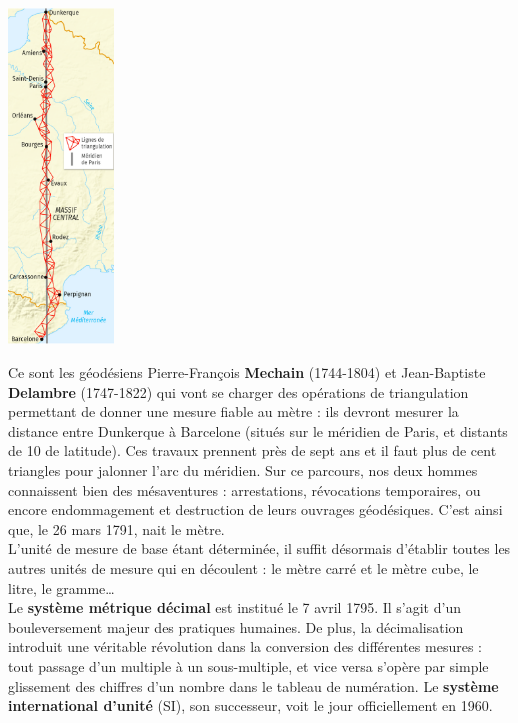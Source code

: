\begin{minipage}{3.25cm}
   \includegraphics[width=2.8cm]{Grandeurs_mesures/Images/M13_cours_meridien}
\end{minipage}
\begin{minipage}{13.45cm}
   Ce sont les géodésiens Pierre-François \textbf{Mechain} (1744-1804) et Jean-Baptiste \textbf{Delambre} (1747-1822) qui vont se charger des opérations de triangulation permettant de donner une mesure fiable au mètre : ils devront mesurer la distance entre Dunkerque à Barcelone (situés sur le méridien de Paris, et distants de 10\degre{} de latitude). Ces travaux prennent près de sept ans et il faut plus de cent triangles pour jalonner l'arc du méridien. Sur ce parcours, nos deux hommes connaissent bien des mésaventures : arrestations, révocations temporaires, ou encore endommagement et destruction de leurs ouvrages géodésiques\footnotemark[2]. C'est ainsi que, le 26 mars 1791, nait le mètre. \\ [2mm] 
   L'unité de mesure de base étant déterminée, il suffit désormais d'établir toutes les autres unités de mesure qui en découlent : le mètre carré et le mètre cube, le litre, le gramme\dots{} \\
   Le {\bf système métrique décimal} est institué le 7 avril 1795. Il s'agit d'un bouleversement majeur des pratiques humaines. De plus, la décimalisation introduit une véritable révolution dans la conversion des différentes mesures : tout passage d'un multiple à un sous-multiple, et vice versa s'opère par simple glissement des chiffres d'un nombre dans le tableau de numération. Le {\bf système international d'unité} (SI), son successeur, voit le jour officiellement en 1960.
\end{minipage}

